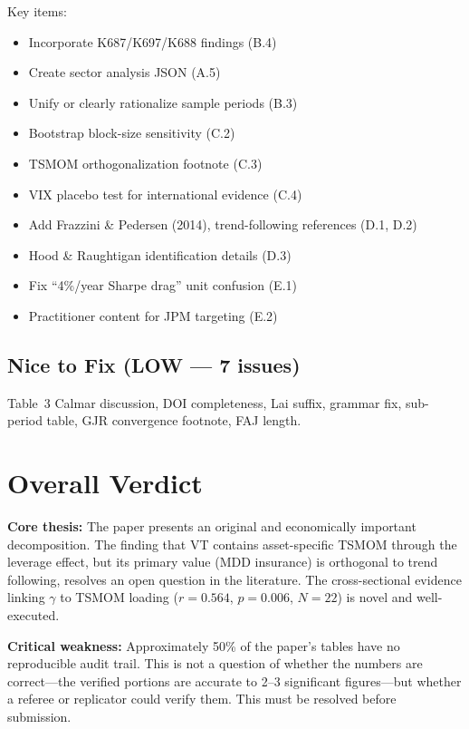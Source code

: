 \documentclass[12pt,a4paper]{article}
\begin{document}
Key items:
\begin{itemize}
    \item Incorporate K687/K697/K688 findings (B.4)
    \item Create sector analysis JSON (A.5)
    \item Unify or clearly rationalize sample periods (B.3)
    \item Bootstrap block-size sensitivity (C.2)
    \item TSMOM orthogonalization footnote (C.3)
    \item VIX placebo test for international evidence (C.4)
    \item Add Frazzini \& Pedersen (2014), trend-following references (D.1, D.2)
    \item Hood \& Raughtigan identification details (D.3)
    \item Fix ``4\%/year Sharpe drag'' unit confusion (E.1)
    \item Practitioner content for JPM targeting (E.2)
\end{itemize}

\subsection*{Nice to Fix (LOW --- 7 issues)}

Table~3 Calmar discussion, DOI completeness, Lai suffix, grammar fix, sub-period table, GJR convergence footnote, FAJ length.


\section{Overall Verdict}
\label{sec:verdict}

\textbf{Core thesis:} The paper presents an original and economically important decomposition. The finding that VT contains asset-specific TSMOM through the leverage effect, but its primary value (MDD insurance) is orthogonal to trend following, resolves an open question in the literature. The cross-sectional evidence linking $\gamma$ to TSMOM loading ($r = 0.564$, $p = 0.006$, $N = 22$) is novel and well-executed.

\textbf{Critical weakness:} Approximately 50\% of the paper's tables have no reproducible audit trail. This is not a question of whether the numbers are correct---the verified portions are accurate to 2--3 significant figures---but whether a referee or replicator could verify them. This must be resolved before submission.
\end{document}
